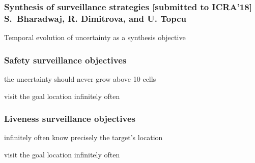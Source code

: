 \documentclass[xcolor=dvipsnames]{beamer}
\begin{document}
\begin{frame}
\frametitle{Synthesis of surveillance strategies  {\small [submitted to ICRA'18]} \newline \small S.\ Bharadwaj, R. Dimitrova, and U. Topcu}

 Temporal evolution of uncertainty as a synthesis objective

\bigskip



\end{frame}

\begin{frame}
\frametitle{Safety surveillance objectives}


 the uncertainty should never grow above 10 cells

\smallskip

 visit the goal location infinitely often


\bigskip

 \begin{center} 

 \end{center}

\end{frame}

\begin{frame}
\frametitle{Liveness surveillance objectives}


 infinitely often know precisely the target's location

\smallskip

 visit the goal location infinitely often


\bigskip

 \begin{center} 

 \end{center}

\end{frame}
\end{document}
